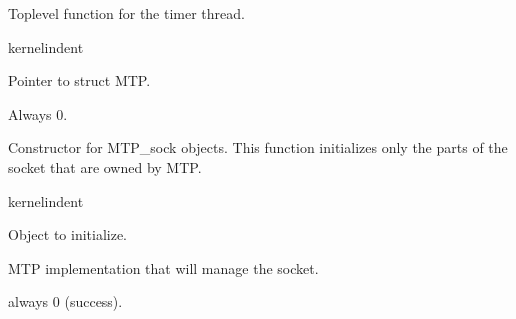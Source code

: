 \documentclass[letterpaper,10pt,english]{sphinxmanual}
\begin{document}
\begin{fulllineitems}
\label{\detokenize{mtpimpl.c:c.MTP_timer_main}}
\pysigstartsignatures
\pysigstartmultiline
{}
\pysigstopmultiline
\pysigstopsignatures
\sphinxAtStartPar
Top\sphinxhyphen{}level function for the timer thread.

\end{fulllineitems}


\begin{sphinxuseclass}{kernelindent}
\sphinxAtStartPar
{}
\begin{description}
\sphinxAtStartPar
Pointer to struct MTP.

\end{description}

\sphinxAtStartPar
{}

\sphinxAtStartPar
Always 0.

\end{sphinxuseclass}
\sphinxstepscope
{}

\begin{fulllineitems}
\label{\detokenize{mtpinst.c:c.MTP_sock_init}}
\pysigstartsignatures
\pysigstartmultiline
{}
\pysigstopmultiline
\pysigstopsignatures
\sphinxAtStartPar
Constructor for MTP\_sock objects. This function initializes only the parts of the socket that are owned by MTP.

\end{fulllineitems}


\begin{sphinxuseclass}{kernelindent}
\sphinxAtStartPar
{}
\begin{description}
\sphinxAtStartPar
Object to initialize.

\sphinxAtStartPar
MTP implementation that will manage the socket.

\end{description}

\sphinxAtStartPar
{}

\sphinxAtStartPar
always 0 (success).

\end{sphinxuseclass}
\end{document}
